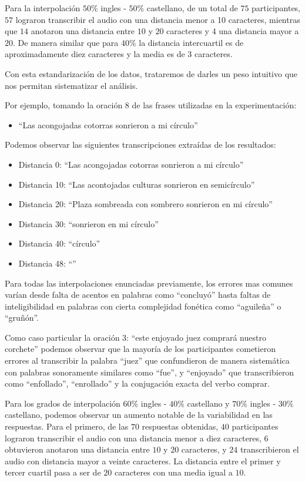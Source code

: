 Para la interpolación $50\%$ ingles - $50\%$ castellano, de un total de $75$ participantes, $57$ lograron transcribir el audio con una distancia menor a 10 caracteres, mientras que $14$ anotaron una distancia entre $10$ y $20$ caracteres y $4$ una distancia mayor a $20$. De manera similar que para $40\%$ la distancia intercuartil es de aproximadamente diez caracteres y la media es de $3$ caracteres.

Con esta estandarización de los datos, trataremos de darles un peso intuitivo que nos permitan sistematizar el análisis.

Por ejemplo, tomando la oración $8$ de las frases utilizadas en la experimentación: 

\begin{itemize}
	\item ``Las acongojadas cotorras sonrieron a mi círculo''
\end{itemize}

Podemos observar las siguientes transcripciones extraídas de los resultados:

\begin{itemize}
	\item Distancia 0: ``Las acongojadas cotorras sonrieron a mi círculo''
	\item Distancia 10: ``Las acontojadas culturas sonrieron en semicírculo''
	\item Distancia 20: ``Plaza sombreada con sombrero sonrieron en mi círculo''
	\item Distancia 30: ``sonrieron en mi círculo''
	\item Distancia 40: ``círculo''
	\item Distancia 48: ``''
\end{itemize}

Para todas las interpolaciones enunciadas previamente, los errores mas comunes varían desde falta de acentos en palabras como ``concluyó'' hasta faltas de inteligibilidad en palabras con cierta complejidad fonética como ``aguileña'' o ``gruñón''.

Como caso particular la oración $3$: ``este enjoyado juez comprará nuestro corchete'' podemos observar que la mayoría de los participantes cometieron errores al transcribir la palabra ``juez'' que confundieron de manera sistemática con palabras sonoramente similares como ``fue'', y ``enjoyado'' que transcribieron como ``enfollado'', ``enrollado'' y la conjugación exacta del verbo comprar.

Para los grados de interpolación $60\%$ ingles - $40\%$ castellano y $70\%$ ingles - $30\%$ castellano, podemos observar un aumento notable de la variabilidad en las respuestas. Para el primero, de las $70$ respuestas obtenidas, $40$ participantes lograron transcribir el audio con una distancia menor a diez caracteres, $6$ obtuvieron anotaron una distancia entre $10$ y $20$ caracteres, y $24$ transcribieron el audio con distancia mayor a veinte caracteres. La distancia entre el primer y tercer cuartil pasa a ser de $20$ caracteres con una media igual a $10$.

